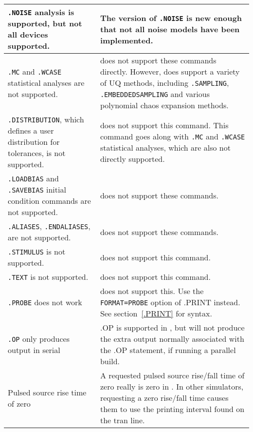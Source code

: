 \begin{longtable}[h] {>{\raggedright\small}m{2in}|>{\raggedright\let\\\tabularnewline\small}m{4in}}
\texttt{.NOISE} analysis is supported, but not all devices supported. & The \Xyce{} version of \texttt{.NOISE} is new enough that not all noise models have been implemented.
\\ \hline

\texttt{.MC} and \texttt{.WCASE} statistical analyses are not supported.  
  & \Xyce{} does not support these commands directly. However, \Xyce{} does support a variety of UQ methods, including \texttt{.SAMPLING}, \texttt{.EMBEDDEDSAMPLING} and various polynomial chaos expansion methods.
\\ \hline

\texttt{.DISTRIBUTION}, which defines a user distribution for tolerances, is not supported.  
& \Xyce{} does not support this command.  This command goes along with 
\texttt{.MC} and \texttt{.WCASE} statistical analyses, which are also not directly supported. \\ \hline

\texttt{.LOADBIAS} and \texttt{.SAVEBIAS} initial condition commands are not supported.  
& \Xyce{} does not support these commands.  \\ \hline

\texttt{.ALIASES}, \texttt{.ENDALIASES}, are not supported.
& \Xyce{} does not support these commands.  \\ \hline

\texttt{.STIMULUS} is not supported.  & \Xyce{} does not support this command.  \\ \hline

\texttt{.TEXT} is not supported.  & \Xyce{} does not support this command.  \\ \hline

\texttt{.PROBE} does not work & \Xyce{} does not support this.  Use the 
\texttt{FORMAT=PROBE} option of .PRINT instead.  See 
section~\ref{.PRINT} for syntax.\\ \hline

\texttt{.OP} only produces output in serial & .OP is supported in \Xyce{}, but will not
produce the extra output normally associated with the .OP statement, if running a parallel build.\\ \hline

Pulsed source rise time of zero & A requested pulsed source rise/fall time of
zero really is zero in \Xyce{}.  In other simulators, requesting a zero
rise/fall time causes them to use the printing interval found on the tran
line.\\ \hline


\end{longtable}
